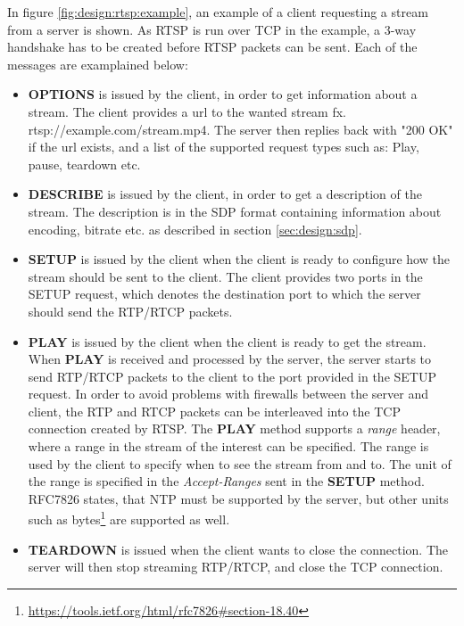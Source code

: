 In figure \ref{fig:design:rtsp:example}, an example of a client requesting a stream from a server is shown. As RTSP is run over TCP in the example, a 3-way handshake has to be created before RTSP packets can be sent.
Each of the messages are examplained below:
\begin{itemize}
	\item \textbf{OPTIONS} is issued by the client, in order to get information about a stream. The client provides a url to the wanted stream fx. rtsp://example.com/stream.mp4. The server then replies back with "200 OK" if the url exists, and a list of the supported request types such as: Play, pause, teardown etc.
	
	\item \textbf{DESCRIBE} is issued by the client, in order to get a description of the stream. The description is in the SDP format containing information about encoding, bitrate etc. as described in section \ref{sec:design:sdp}.
	
	\item \textbf{SETUP} is issued by the client when the client is ready to configure how the stream should be sent to the client. The client provides two ports in the SETUP request, which denotes the destination port to which the server should send the RTP/RTCP packets.
	
	\item \textbf{PLAY} is issued by the client when the client is ready to get the stream.
When \textbf{PLAY} is received and processed by the server, the server starts to send RTP/RTCP packets to the client to the port provided in the SETUP request.
In order to avoid problems with firewalls between the server and client, the RTP and RTCP packets can be interleaved into the TCP connection created by RTSP.
The \textbf{PLAY} method supports a \textit{range} header, where a range in the stream of the interest can be specified.
The range is used by the client to specify when to see the stream from and to. 
The unit of the range is specified in the \textit{Accept-Ranges} sent in the \textbf{SETUP} method. RFC7826 states, that \ac{NTP} must be supported by the server, but other units such as bytes\footnote{\url{https://tools.ietf.org/html/rfc7826\#section-18.40}} are supported as well.
	\item \textbf{TEARDOWN} is issued when the client wants to close the connection. The server will then stop streaming RTP/RTCP, and close the TCP connection.
\end{itemize}


